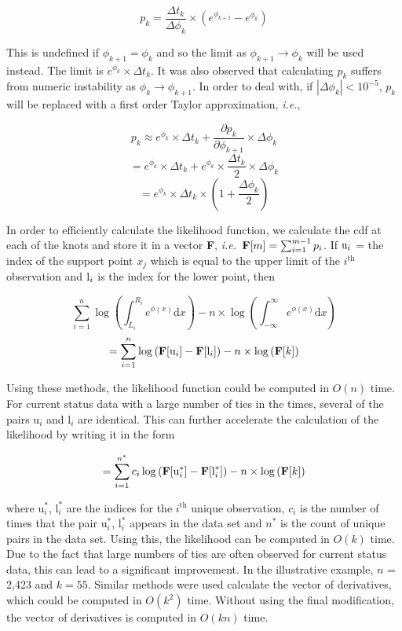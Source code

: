 \documentclass[10pt]{article}
\begin{document}
	\[ p_k = \frac{\Delta t_k} {\Delta \phi_k } \times (e^{\phi_{k+1} } - e^{\phi_k } ) 
	\]
	
	This is undefined if $\phi_{k+1} = \phi_k$ and so the limit as $\phi_{k+1} \rightarrow \phi_k$ will be used instead. The limit is $e^{\phi_k} \times \Delta t_k$. It was also observed that calculating $p_k$ suffers from numeric instability as $\phi_k \rightarrow \phi_{k+1}$. In order to deal with, if $|\Delta\phi_k | < 10^{-5}$, $p_k$ will be replaced with a first order Taylor approximation, \emph{i.e.}, 
	
	\[ p_k \approx e^{\phi_k} \times \Delta t_k + \frac{\partial p_k}{\partial \phi_{k+1}} \times \Delta \phi_k 
	\]
	\[
	= e^{\phi_k} \times \Delta t_k + e^{\phi_k} \times \frac {\Delta t_k} {2} \times \Delta \phi_k
	\]
	\[
	= e^{\phi_k} \times \Delta t_k \times \left(1 + \frac{\Delta \phi_k}{2} \right)
	\]

	In order to efficiently calculate the likelihood function, we calculate the cdf at each of the knots and store it in a vector {\bf F}, \emph{i.e.}\ $ {\bf F}[m] = \sum_{i=1}^{m-1} p_i$. If $ {\text u}_i$ = the index of the support point $x_j$ which is equal to the upper limit of the $i^{\mathrm{th} } $ observation and ${\text l}_i$ is the index for the lower point, then 

	\[ \displaystyle \sum_{i = 1}^n \log \left( \int_{L_i}^{R_i} e^ { \phi(x) } \mathrm{d}x \right) - n \times \log \left(  \int_{-\infty}^{\infty} e^ { \phi(x) } \mathrm{d}x \right) 
	\]
	\[=  \displaystyle \sum_{i = 1}^n \log \left({\bf F} [\text{u}_i] - {\bf F} [\text{l}_i] \right) - n \times \log \left(  {\bf F}[k] \right) 
	\]
	
	Using these methods, the likelihood function could be computed in $O(n)$ time. For current status data with a large number of ties in the times, several of the pairs $\text{u}_i$ and $\text{l}_i$ are identical. This can further accelerate the calculation of the likelihood by writing it in the form 
	
	\[=  \displaystyle \sum_{i = 1}^{n^*} c_i\log \left({\bf F} [\text{u}_i^*] - {\bf F} [\text{l}_i^*] \right) - n \times \log \left(  {\bf F}[k] \right) 
	\]

	where $\text{u}_i^*$, $\text{l}_i^*$ are the indices for the $i^{\mathrm{th} } $ unique observation, $c_i$ is the number of times that the pair $\text{u}_i^*$, $\text{l}_i^*$ appears in the data set and $n^*$ is the count of unique pairs in the data set. Using this, the likelihood can be computed in $O(k)$ time. Due to the fact that large numbers of ties are often observed for current status data, this can lead to a significant improvement. In the illustrative example, $n$ = 2,423 and $k = 55$.
		Similar methods were used calculate the vector of derivatives, which could be computed in $O(k^2)$ time. Without using the final modification, the vector of derivatives is computed in $O(kn)$ time. 
\end{document}
